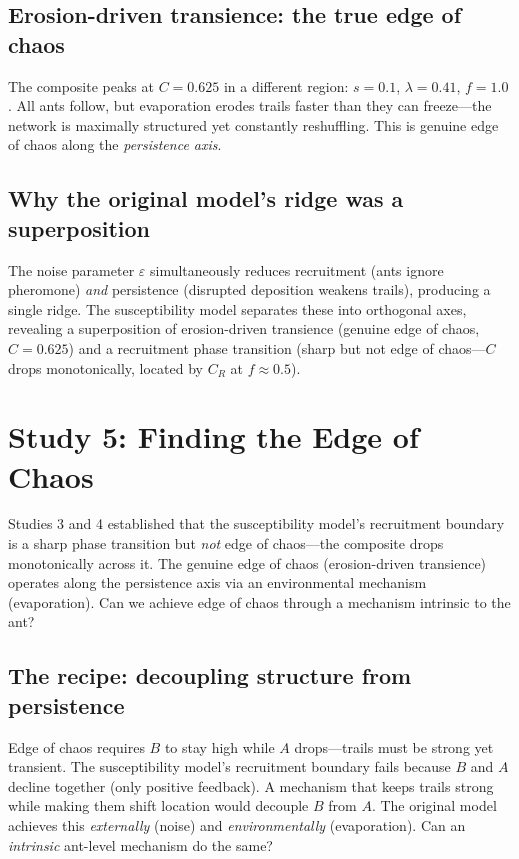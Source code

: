 \documentclass[11pt,a4paper]{article}
\begin{document}
\subsection{Erosion-driven transience: the true edge of chaos}

The composite peaks at $C = 0.625$ in a different region: $s = 0.1$, $\lambda = 0.41$, $f = 1.0$.
All ants follow, but evaporation erodes trails faster than they can freeze---the network is maximally structured yet constantly reshuffling.
This is genuine edge of chaos along the \emph{persistence axis}.

\subsection{Why the original model's ridge was a superposition}

The noise parameter $\varepsilon$ simultaneously reduces recruitment (ants ignore pheromone) \emph{and} persistence (disrupted deposition weakens trails), producing a single ridge.
The susceptibility model separates these into orthogonal axes, revealing a superposition of erosion-driven transience (genuine edge of chaos, $C = 0.625$) and a recruitment phase transition (sharp but not edge of chaos---$C$ drops monotonically, located by $C_R$ at $f \approx 0.5$).

\section{Study 5: Finding the Edge of Chaos}
\label{sec:negative_feedback}

Studies 3 and 4 established that the susceptibility model's recruitment boundary is a sharp phase transition but \emph{not} edge of chaos---the composite drops monotonically across it.
The genuine edge of chaos (erosion-driven transience) operates along the persistence axis via an environmental mechanism (evaporation).
Can we achieve edge of chaos through a mechanism intrinsic to the ant?

\subsection{The recipe: decoupling structure from persistence}

Edge of chaos requires $B$ to stay high while $A$ drops---trails must be strong yet transient.
The susceptibility model's recruitment boundary fails because $B$ and $A$ decline together (only positive feedback).
A mechanism that keeps trails strong while making them shift location would decouple $B$ from $A$.
The original model achieves this \emph{externally} (noise) and \emph{environmentally} (evaporation).
Can an \emph{intrinsic} ant-level mechanism do the same?
\end{document}
